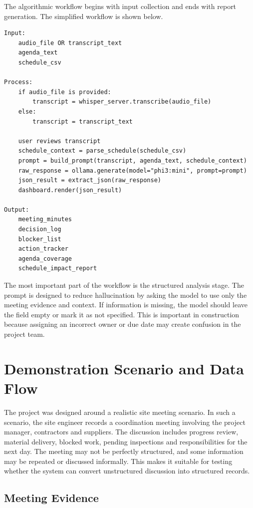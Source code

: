 \documentclass[11pt,a4paper]{article}
\begin{document}
The algorithmic workflow begins with input collection and ends with report generation. The simplified workflow is shown below.

\begin{verbatim}
Input:
    audio_file OR transcript_text
    agenda_text
    schedule_csv

Process:
    if audio_file is provided:
        transcript = whisper_server.transcribe(audio_file)
    else:
        transcript = transcript_text

    user reviews transcript
    schedule_context = parse_schedule(schedule_csv)
    prompt = build_prompt(transcript, agenda_text, schedule_context)
    raw_response = ollama.generate(model="phi3:mini", prompt=prompt)
    json_result = extract_json(raw_response)
    dashboard.render(json_result)

Output:
    meeting_minutes
    decision_log
    blocker_list
    action_tracker
    agenda_coverage
    schedule_impact_report
\end{verbatim}

The most important part of the workflow is the structured analysis stage. The prompt is designed to reduce hallucination by asking the model to use only the meeting evidence and context. If information is missing, the model should leave the field empty or mark it as not specified. This is important in construction because assigning an incorrect owner or due date may create confusion in the project team.

\section{Demonstration Scenario and Data Flow}

The project was designed around a realistic site meeting scenario. In such a scenario, the site engineer records a coordination meeting involving the project manager, contractors and suppliers. The discussion includes progress review, material delivery, blocked work, pending inspections and responsibilities for the next day. The meeting may not be perfectly structured, and some information may be repeated or discussed informally. This makes it suitable for testing whether the system can convert unstructured discussion into structured records.

\subsection{Meeting Evidence}
\end{document}
